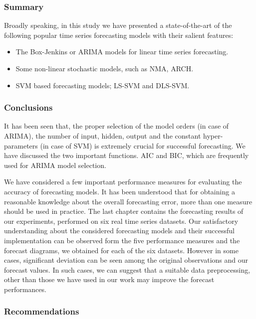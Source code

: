 \documentclass[
  letterpaper,
  DIV=11,
  numbers=noendperiod]{scrartcl}
\providecommand{\tightlist}{%
  \setlength{\itemsep}{0pt}\setlength{\parskip}{0pt}}\usepackage{longtable,booktabs,array}
\begin{document}
\hypertarget{summary}{%
\subsubsection{Summary}\label{summary}}

Broadly speaking, in this study we have presented a state-of-the-art of
the following popular time series forecasting models with their salient
features:

\begin{itemize}
\tightlist
\item
  The Box-Jenkins or ARIMA models for linear time series forecasting.
\item
  Some non-linear stochastic models, such as NMA, ARCH.
\item
  SVM based forecasting models; LS-SVM and DLS-SVM.
\end{itemize}

\hypertarget{conclusions}{%
\subsubsection{Conclusions}\label{conclusions}}

It has been seen that, the proper selection of the model orders (in case
of ARIMA), the number of input, hidden, output and the constant
hyper-parameters (in case of SVM) is extremely crucial for successful
forecasting. We have discussed the two important functions. AIC and BIC,
which are frequently used for ARIMA model selection.

We have considered a few important performance measures for evaluating
the accuracy of forecasting models. It has been understood that for
obtaining a reasonable knowledge about the overall forecasting error,
more than one measure should be used in practice. The last chapter
contains the forecasting results of our experiments, performed on six
real time series datasets. Our satisfactory understanding about the
considered forecasting models and their successful implementation can be
observed form the five performance measures and the forecast diagrams,
we obtained for each of the six datasets. However in some cases,
significant deviation can be seen among the original observations and
our forecast values. In such cases, we can suggest that a suitable data
preprocessing, other than those we have used in our work may improve the
forecast performances.

\hypertarget{recommendations}{%
\subsubsection{Recommendations}\label{recommendations}}
\end{document}
